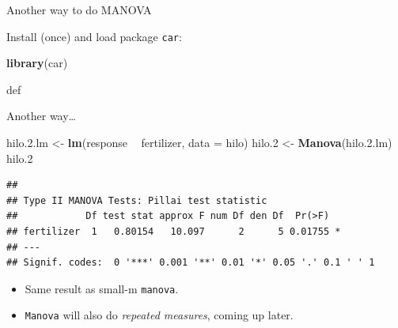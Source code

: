 \documentclass[ignorenonframetext,]{beamer}
\newenvironment{Shaded}{\begin{snugshade}}{\end{snugshade}}
\newcommand{\DataTypeTok}[1]{\textcolor[rgb]{0.13,0.29,0.53}{#1}}
\newcommand{\FloatTok}[1]{\textcolor[rgb]{0.00,0.00,0.81}{#1}}
\newcommand{\KeywordTok}[1]{\textcolor[rgb]{0.13,0.29,0.53}{\textbf{#1}}}
\newcommand{\NormalTok}[1]{#1}
\newcommand{\OperatorTok}[1]{\textcolor[rgb]{0.81,0.36,0.00}{\textbf{#1}}}
\newcommand{\StringTok}[1]{\textcolor[rgb]{0.31,0.60,0.02}{#1}}
\begin{document}
\begin{frame}[fragile]{Another way to do MANOVA}
\protect\hypertarget{another-way-to-do-manova}{}

Install (once) and load package \texttt{car}:

\begin{Shaded}
\begin{Highlighting}[]
\KeywordTok{library}\NormalTok{(car)}
\end{Highlighting}
\end{Shaded}

def

\end{frame}

\begin{frame}[fragile]{Another way\ldots}
\protect\hypertarget{another-way-1}{}

\begin{Shaded}
\begin{Highlighting}[]
\NormalTok{hilo.}\FloatTok{2.}\NormalTok{lm <-}\StringTok{ }\KeywordTok{lm}\NormalTok{(response }\OperatorTok{~}\StringTok{ }\NormalTok{fertilizer, }\DataTypeTok{data =}\NormalTok{ hilo)}
\NormalTok{hilo}\FloatTok{.2}\NormalTok{ <-}\StringTok{ }\KeywordTok{Manova}\NormalTok{(hilo.}\FloatTok{2.}\NormalTok{lm)}
\NormalTok{hilo}\FloatTok{.2}
\end{Highlighting}
\end{Shaded}

\begin{verbatim}
## 
## Type II MANOVA Tests: Pillai test statistic
##            Df test stat approx F num Df den Df  Pr(>F)  
## fertilizer  1   0.80154   10.097      2      5 0.01755 *
## ---
## Signif. codes:  0 '***' 0.001 '**' 0.01 '*' 0.05 '.' 0.1 ' ' 1
\end{verbatim}

\begin{itemize}
\item
  Same result as small-m \texttt{manova}.
\item
  \texttt{Manova} will also do \emph{repeated measures}, coming up
  later.
\end{itemize}

\end{frame}
\end{document}
